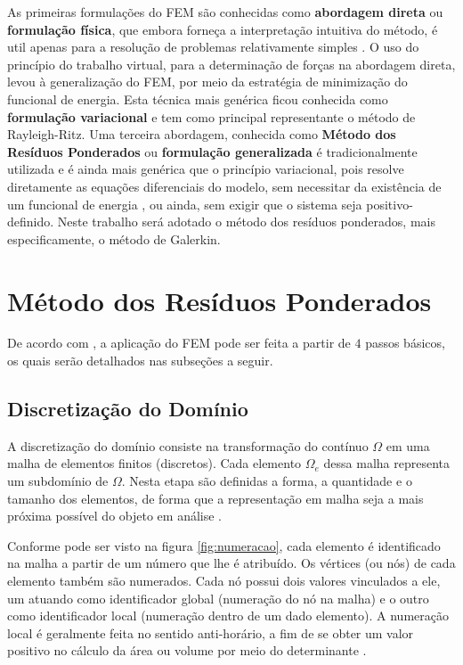 \documentclass[
    12pt,               %
    openright,          %
    oneside,
    a4paper,            %
    english,            %
    french,             %
    spanish,            %
    brazil              %
    ]{abntex2}
\begin{document}
As primeiras formulações do FEM são conhecidas como \textbf{abordagem direta} ou \textbf{formulação física}, que embora forneça a interpretação intuitiva do método, é util apenas para a resolução de problemas relativamente simples \cite{huebner, desai, zien}. O uso do princípio do trabalho virtual, para a determinação de forças na abordagem direta, levou à generalização do FEM, por meio da estratégia de minimização do funcional de energia. Esta técnica mais genérica  ficou conhecida como \textbf{formulação variacional} \cite{desai, zien, jin} e tem como principal representante o método de Rayleigh-Ritz. Uma terceira abordagem, conhecida como \textbf{Método dos Resíduos Ponderados} ou \textbf{formulação generalizada} \cite{zien, huebner} é tradicionalmente utilizada e é ainda mais genérica que o princípio variacional, pois resolve diretamente as equações diferenciais do modelo, sem necessitar da existência de um funcional de energia \cite{desai}, ou ainda, sem exigir que o sistema seja positivo-definido. Neste trabalho será adotado o método dos resíduos ponderados, mais especificamente, o método de Galerkin.


\section{Método dos Resíduos Ponderados}
\label{sec:proc}

De acordo com , a aplicação do FEM pode ser feita a partir de $4$ passos básicos, os quais serão detalhados nas subseções a seguir.


\subsection{Discretização do Domínio} 
A discretização do domínio consiste na transformação do contínuo $\Omega$ em uma malha de elementos finitos (discretos). Cada elemento $\Omega_e$ dessa malha representa um subdomínio de $\Omega$.  
Nesta etapa são definidas a forma, a quantidade e o tamanho dos elementos, de forma que a representação em malha seja a mais próxima possível do objeto em análise \cite{desai}.

Conforme pode ser visto na figura \ref{fig:numeracao}, cada elemento é identificado na malha a partir de um número que lhe é atribuído. Os vértices (ou nós) de cada elemento também são numerados. Cada nó possui dois valores vinculados a ele, um atuando como identificador global (numeração do nó na malha) e o outro como identificador local (numeração dentro de um dado elemento). A numeração local é geralmente feita no sentido anti-horário, a fim de se obter um valor positivo no cálculo da área ou volume por meio do  determinante \cite{sadiku, jin}. 
\end{document}
